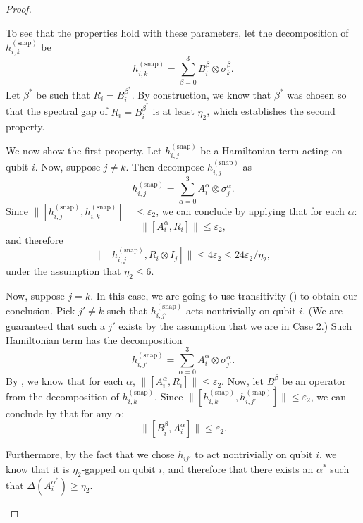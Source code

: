 \documentclass[a4paper,onecolumn,11pt]{quantumarticle}
\theoremstyle{plain}
\newcommand{\eps}{\varepsilon}
\newcommand{\snp}{{(\mathrm{snap})}}
\begin{document}
\begin{proof}
\begin{enumerate}
To see that the properties hold with these parameters, let the decomposition of $h^\snp_{i,k}$ be
\begin{equation}
    h^\snp_{i,k} = \sum_{\beta=0}^3 B_i^\beta \otimes \sigma_k^\beta.
\end{equation}
Let $\beta^*$ be such that $R_i = B_i^{\beta^*}$. By construction, we know that $\beta^*$ was chosen so that the spectral gap of  $R_i = B_i^{\beta^*}$ is at least $\eta_2$, which establishes the second property. 

We now show the first property. Let $h^\snp_{i,j}$ be a Hamiltonian term acting on qubit $i$. Now, suppose $j \neq k$. Then decompose $h^\snp_{i,j}$ as
\begin{equation}
    h^\snp_{i,j}  = \sum_{\alpha=0}^3 A_i^\alpha \otimes \sigma_j^\alpha. 
\end{equation}
Since $\|[h^\snp_{i,j},h^\snp_{i,k}]\| \leq \eps_2$, we can conclude by applying  that for each $\alpha$:
\begin{equation}
 \| [A_i^\alpha, R_i] \| \leq \eps_2, \label{eq:pivot-commutes-different-term-2}
\end{equation}
and therefore
\begin{equation}
    \| [h^\snp_{i,j}, R_i \otimes I_j ] \| \leq 4 \eps_2 \leq 24\eps_2/\eta_2,
\end{equation}
under the assumption that $\eta_2 \leq 6$.

Now, suppose $j = k$. In this case, we are going to use transitivity () to obtain our conclusion. Pick $j' \neq k$ such that $h^\snp_{i,j'}$ acts nontrivially on qubit $i$. (We are guaranteed that such a $j'$ exists by the assumption that we are in Case 2.) Such Hamiltonian term has the decomposition
\begin{equation}
    h^\snp_{i,j'} = \sum_{\alpha=0}^3 A_i^\alpha \otimes \sigma_{j'}^\alpha. 
\end{equation}
By , we know that for each $\alpha$, $\| [A_i^\alpha, R_i]\| \leq \eps_2.$ Now, let $B_i^\beta$ be an operator from the decomposition of $h^\snp_{i,k}$. Since $\| [h^\snp_{i,k}, h^\snp_{i,j'}] \| \leq \eps_2$, we can conclude by  that for any $\alpha$:
\begin{equation}
    \| [ B_i^\beta, A_i^\alpha] \| \leq \eps_2.
\end{equation}

Furthermore, by the fact that we chose $h_{ij'}$ to act nontrivially on qubit $i$, we know that it is $\eta_2$-gapped on qubit $i$, and therefore that there exists an $\alpha^*$ such that $\Delta(A_i^{\alpha^*}) \geq \eta_2$. 


\end{enumerate}
\end{proof}
\end{document}
